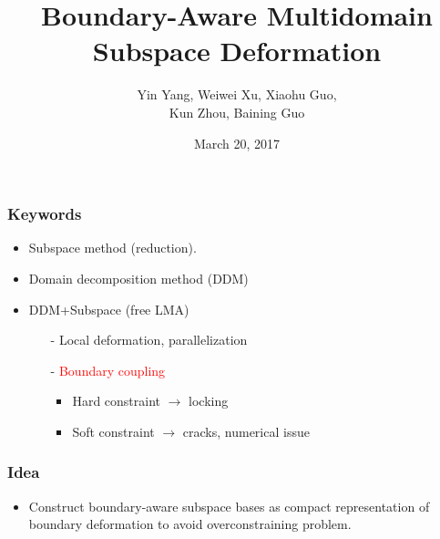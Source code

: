 \documentclass[serif,mathserif, 12pt]{beamer}
\author{Yin Yang, Weiwei Xu, Xiaohu Guo,\\ Kun Zhou, Baining Guo}
\title[\hspace{2em}\insertframenumber/\inserttotalframenumber]{Boundary-Aware Multidomain Subspace Deformation}
\date{March 20, 2017}
\newcommand{\TODO}[1]{\textcolor{red}{#1}}
\newcommand{\TODOG}[1]{\textcolor{green!50!black}{#1}}
\begin{document}
\maketitle

\begin{frame}
  \frametitle{Keywords}
  \begin{itemize}
  \item Subspace method (reduction).
    \pause
  \item Domain decomposition method (DDM)
    \pause
  \item DDM+Subspace (free LMA)
    \pause
    \begin{itemize}
    \item[-] \TODOG{Local deformation, parallelization}
    \item[-] \TODO{Boundary coupling}
      \begin{itemize}
      \item Hard constraint $\rightarrow$ locking
      \item Soft constraint $\rightarrow$ cracks, numerical issue
      \end{itemize}
    \end{itemize}
  \end{itemize}
\end{frame}

\begin{frame}
  \frametitle{Idea}
  \begin{itemize}
  \item Construct boundary-aware subspace bases as compact
    representation of boundary deformation to avoid
    overconstraining problem.
  \end{itemize}
\end{frame}
\end{document}
